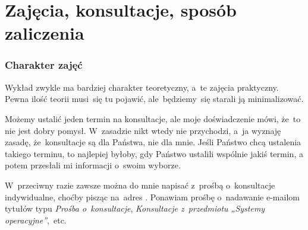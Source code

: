 \documentclass[10pt,t]{beamer}
\begin{document}
\section{Zajęcia, konsultacje, sposób zaliczenia}


\begin{frame}
  \frametitle{Charakter zajęć}


  Wykład zwykle ma bardziej charakter teoretyczny, a~te zajęcia
  \alert{praktyczny}. Pewna ilość teorii musi~się tu pojawić,
  ale~będziemy~się starali ją minimalizować.

  Możemy ustalić jeden termin na konsultacje, ale moje doświadczenie mówi,
  że~to nie jest dobry pomysł. W~zasadzie nikt wtedy nie przychodzi, a~ja
  wyznaję zasadę, że~konsultacje są dla Państwa, nie dla mnie. Jeśli Państwo
  chcą ustalenia takiego terminu, to najlepiej byłoby, gdy Państwo ustalili
  wspólnie jakiś termin, a potem przesłali mi informacji o~swoim wyborze.

  W~przeciwny razie zawsze można do mnie napisać z~prośbą o~konsultacje
  indywidualne, choćby pisząc na~adres \email. Ponawiam prośbę o~nadawanie
  e-mailom tytułów typu \textit{Prośba o~konsultacje}, \textit{Konsultacje
    z~przedmiotu „Systemy operacyjne”},~etc.

\end{frame}
\end{document}
